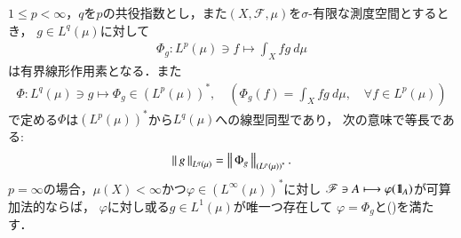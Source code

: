 	\begin{screen}
		\begin{thm}[$L^p$の共役空間]\label{thm:dual_space_of_L_p}
			$1 \leq p < \infty$，$q$を$p$の共役指数とし，また$(X,\mathscr{F},\mu)$を$\sigma$-有限な測度空間とするとき，
			$g \in L^q(\mu)$に対して
			\begin{align}
				\Phi_g: L^p(\mu) \ni f \longmapsto \int_X fg\ d\mu
				\label{eq:thm_dual_space_of_L_p_1}
			\end{align}
			は有界線形作用素となる．また
			\begin{align}
				\Phi: L^q(\mu) \ni g \longmapsto \Phi_g \in \left( L^p(\mu) \right)^*,
				\quad \left( \Phi_g(f) = \int_X fg\ d\mu,\quad \forall f \in L^p(\mu) \right)
			\end{align}
			で定める$\Phi$は$\left( L^p(\mu) \right)^*$から$L^q(\mu)$への線型同型であり，
			次の意味で等長である:
			\begin{align}
				\left\|\, g\, \right\|_{L^q(\mu)} = \left\|\, \Phi_g\, \right\|_{\left( L^p(\mu) \right)^*}.
				\label{eq:thm_dual_space_of_L_p_asseretion_2}
			\end{align}
			$p=\infty$の場合，$\mu(X) < \infty$かつ$\varphi \in \left( L^\infty(\mu) \right)^*$に対し
			$\mathscr{F} \ni A \longmapsto \varphi(\mbox{1}\hspace{-0.25em}\mbox{l}_A)$が可算加法的ならば，
			$\varphi$に対し或る$g \in L^1(\mu)$が唯一つ存在して
			$\varphi = \Phi_g$と()を満たす．
		\end{thm}
	\end{screen}
	
